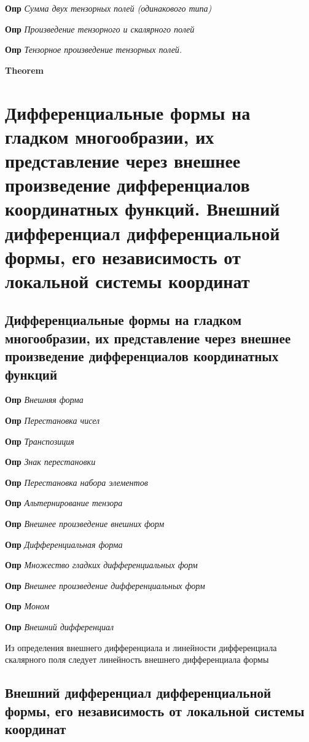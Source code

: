 \documentclass[a4paper, 14pt]{article}
\begin{document}
    \textbf{Опр} \textit{Сумма двух тензорных полей (одинакового типа)}
    
    \textbf{Опр} \textit{Произведение тензорного и скалярного полей}
    
    \textbf{Опр} \textit{Тензорное произведение тензорных полей.}
    
    \textbf{Theorem}
    
    \section{Дифференциальные формы на гладком многообразии, их представление через внешнее произведение
    дифференциалов координатных функций.
    Внешний дифференциал дифференциальной формы, его независимость от локальной системы координат}
    
    \subsection{Дифференциальные формы на гладком многообразии, их представление через внешнее произведение
    дифференциалов координатных функций}
    
    \textbf{Опр} \textit{Внешняя форма}
    
    \textbf{Опр} \textit{Перестановка чисел}
    
    \textbf{Опр} \textit{Транспозиция}
    
    \textbf{Опр} \textit{Знак перестановки}
    
    \textbf{Опр} \textit{Перестановка набора элементов}
    
    \textbf{Опр} \textit{Альтернирование тензора}
    
    \textbf{Опр} \textit{Внешнее произведение внешних форм}
    
    \textbf{Опр} \textit{Дифференциальная форма}
    
    \textbf{Опр} \textit{Множество гладких дифференциальных форм}
    
    \textbf{Опр} \textit{Внешнее произведение дифференциальных форм}
    
    \textbf{Опр} \textit{Моном}
    
    \textbf{Опр} \textit{Внешний дифференциал}
    
    Из определения внешнего дифференциала и линейности дифференциала скалярного поля следует линейность внешнего
    дифференциала формы
    
    \subsection{Внешний дифференциал дифференциальной формы, его независимость от локальной системы координат}
    
\end{document}

